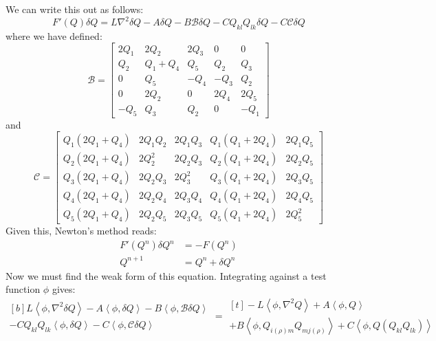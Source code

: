 \documentclass[reqno]{article}
\begin{document}
	We can write this out as follows:
	\begin{equation}
		F' (Q) \delta Q
		= L \nabla^2 \delta Q
		- A \delta Q
		- B \mathcal{B} \delta Q
		- C Q_{kl} Q_{lk} \delta Q
		- C \mathcal{C} \delta Q
	\end{equation}
	where we have defined:
	\begin{equation}
		\mathcal{B}
		= 
		\left[\begin{matrix}
		2 Q_{1} & 2 Q_{2} & 2 Q_{3} & 0 & 0\\
		Q_{2} & Q_{1} + Q_{4} & Q_{5} & Q_{2} & Q_{3}\\
		0 & Q_{5} & - Q_{4} & - Q_{3} & Q_{2}\\0 & 2 Q_{2} & 0 & 2 Q_{4} & 2 Q_{5}\\
		- Q_{5} & Q_{3} & Q_{2} & 0 & - Q_{1}
		\end{matrix}\right]
	\end{equation}
	and
	\begin{equation}
		\mathcal{C}
		=
		\left[\begin{matrix}
		Q_{1} \left(2 Q_{1} + Q_{4}\right) & 2 Q_{1} Q_{2} & 2 Q_{1} Q_{3} & Q_{1} \left(Q_{1} + 2 Q_{4}\right) & 2 Q_{1} Q_{5}\\
		Q_{2} \left(2 Q_{1} + Q_{4}\right) & 2 Q_{2}^{2} & 2 Q_{2} Q_{3} & Q_{2} \left(Q_{1} + 2 Q_{4}\right) & 2 Q_{2} Q_{5}\\
		Q_{3} \left(2 Q_{1} + Q_{4}\right) & 2 Q_{2} Q_{3} & 2 Q_{3}^{2} & Q_{3} \left(Q_{1} + 2 Q_{4}\right) & 2 Q_{3} Q_{5}\\
		Q_{4} \left(2 Q_{1} + Q_{4}\right) & 2 Q_{2} Q_{4} & 2 Q_{3} Q_{4} & Q_{4} \left(Q_{1} + 2 Q_{4}\right) & 2 Q_{4} Q_{5}\\
		Q_{5} \left(2 Q_{1} + Q_{4}\right) & 2 Q_{2} Q_{5} & 2 Q_{3} Q_{5} & Q_{5} \left(Q_{1} + 2 Q_{4}\right) & 2 Q_{5}^{2}\end{matrix}\right]
	\end{equation}
	Given this, Newton's method reads:
	\begin{align}
		F'(Q^n) \delta Q^n &= -F(Q^n) \\
		Q^{n + 1} &
		= Q^n + \delta Q^n
	\end{align}
	Now we must find the weak form of this equation.
	Integrating against a test function $\phi$ gives:
	\begin{equation}
		\begin{multlined}[b]
		L \left< \phi, \nabla^2 \delta Q \right>
		- A \left< \phi, \delta Q \right>
		- B \left< \phi, \mathcal{B} \delta Q \right> \\
		- C Q_{kl} Q_{lk} \left< \phi, \delta Q \right>
		- C \left< \phi, \mathcal{C} \delta Q \right>
		\end{multlined}
		=
		\begin{multlined}[t]
		- L \left< \phi, \nabla^2 Q \right>
		+ A \left< \phi, Q \right> \\
		+ B \left< \phi, Q_{i (\rho) m} Q_{m j (\rho)} \right>
		+ C \left< \phi, Q (Q_{kl} Q_{lk}) \right>
		\end{multlined}
	\end{equation}
\end{document}
